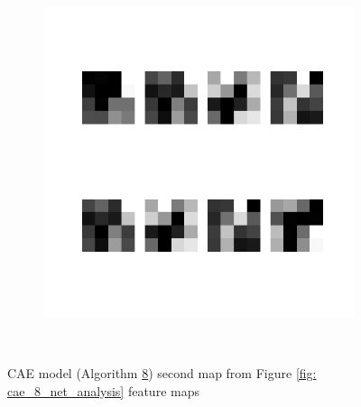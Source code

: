 \begin{figure}
\begin{subfigure}[b]{0.4\linewidth}
    \end{subfigure}
    \hfill
    \begin{subfigure}[b]{0.4\linewidth}
        \includegraphics[width=\linewidth]{images/cae_online_lstm/caelstm_section_cae_training_house_10000_model_feature_maps_map_1_0_0.png}
    \end{subfigure}
    \\[-0.5cm]
    \caption{CAE model (Algorithm \hyperref[tab: app_evalalgorithms]{8}) second map from Figure \ref{fig: cae_8_net_analysis} feature maps}
    \label{fig: cae_8_feature_maps_2}
\end{figure}

\clearpage

